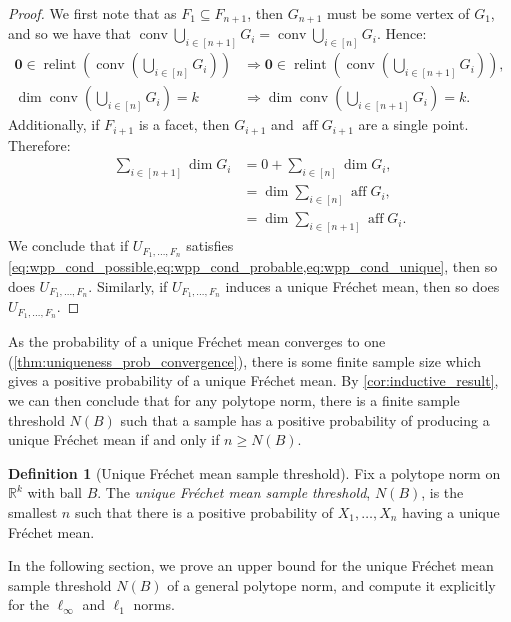 \documentclass[10pt]{article}
\theoremstyle{definition}
\newtheorem{definition}[theorem]{Definition}
\theoremstyle{remark}
\newcommand{\R}{\mathbb{R}}
\newcommand{\CType}{F_1,\dots,F_n}
\newcommand{\sample}{ X_1,\dots, X_n}
\DeclareMathOperator{\conv}{conv}
\DeclareMathOperator{\relint}{relint}
\DeclareMathOperator{\aff}{aff}
\renewcommand{\vec}[1]{\mathbf{#1}}
\begin{document}
	\begin{proof}
		We first note that as $F_1 \subseteq F_{n+1}$, then $G_{n+1}$ must be some vertex of $G_1$, and so we have that $\conv \bigcup_{i \in [n+1]} G_i = \conv \bigcup_{i \in [n]} G_i$. Hence:
		\begin{align*}
			\vec 0 \in \relint \left( \conv \left(\textstyle \bigcup_{i \in [n]} G_i \right) \right) &\Rightarrow \vec 0 \in \relint \left( \conv \left(\textstyle \bigcup_{i \in [n+1]} G_i \right) \right), \\
			\dim \conv \left(\textstyle \bigcup_{i \in [n]} G_i \right) = k &\Rightarrow \dim \conv \left(\textstyle \bigcup_{i \in [n+1]} G_i \right) = k.
		\end{align*}
		Additionally, if $F_{i+1}$ is a facet, then $G_{i+1}$ and $\aff G_{i+1}$ are a single point. Therefore:
		\begin{align*}
			\textstyle \sum_{i \in [n+1]} \dim G_i &= 0 + \textstyle\sum_{i \in [n]} \dim G_i,\\
			&= \textstyle\dim \sum_{i \in [n]} \aff G_i,\\
			&= \textstyle\dim \sum_{i \in [n+1]} \aff G_i. 
		\end{align*}
		We conclude that if $U_{\CType}$ satisfies \cref{eq:wpp_cond_possible,eq:wpp_cond_probable,eq:wpp_cond_unique}, then so does $U_{F_1,\dots,F_n}$. Similarly, if $U_{\CType}$ induces a unique Fr\'echet mean, then so does $U_{F_1,\dots,F_n}$.
	\end{proof}
	
	As the probability of a unique Fr\'echet mean converges to one (\cref{thm:uniqueness_prob_convergence}), there is some finite sample size which gives a positive probability of a unique Fr\'echet mean. By \cref{cor:inductive_result}, we can then conclude that for any polytope norm, there is a finite sample threshold $N(B)$ such that a sample has a positive probability of producing a unique Fr\'echet mean if and only if $n\geq N(B)$. 
	
	\begin{definition}[Unique Fr\'echet mean sample threshold]
		Fix a polytope norm on $\R^k$ with ball $B$. The \emph{unique Fr\'echet mean sample threshold}, $N(B)$, is the smallest $n$ such that there is a positive probability of $\sample$ having a unique Fr\'echet mean.
	\end{definition}
	
	In the following section, we prove an upper bound for the unique Fr\'echet mean sample threshold $N(B)$ of a general polytope norm, and compute it explicitly for the $\ell_\infty$ and $\ell_1$ norms.
	
\end{document}

